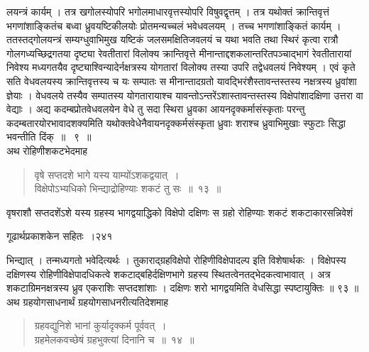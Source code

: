 \documentclass[11pt, openany]{book}
\begin{document}
\noindent लयन्त्रं कार्यम् । तत्र खगोलस्योपरि भगोलमाधारवृत्तस्योपरि विषुवद्वृत्तम् । तत्र यथोक्तं क्रान्तिवृत्तं भगणांशाङ्कितंच बध्वा ध्रुवयष्टिकीलयोः प्रोतमन्यच्चलं भवेधवलयम् । तच्च भगणांशाङ्कितं कार्यम् । ततस्तद्गोलयन्त्रं सम्यग्धुवाभिमुख यष्टिकं जलसमक्षितिजवलयं च यथा भवति तथा स्थिरं कृत्वा रात्रौ गोलगध्यच्छिद्रगतया दृष्ट्या रेवतीतारां विलोक्य क्रान्तिवृत्ते मीनान्ताद्दशकलान्तरितपञ्चाद्भागं रेवतीतारायां निवेश्य मध्यगतयैव दृष्ट्याश्विन्यादेर्नक्षत्रस्य योगतारां विलोक्य तस्या उपरि तद्वेधवलयं निवेश्यम् । एवं कृते सति वेधवलयस्य क्रान्तिवृत्तस्य च यः सम्पातः स मीनान्तादग्रतो यावद्भिरंशैस्तावन्तस्तस्य नक्षत्रस्य ध्रुवांशा ज्ञेयाः । वेधवलये तस्यैव सम्पातस्य योगतारायाश्च यावन्तोऽन्तरेंऽशास्तावन्तस्तस्य विक्षेपांशादक्षिणा उत्तरा वा वेद्याः । अद्य कदम्बप्रोतवेधवलयेन वेधे तु सदा स्थिरा ध्रुवका आयनदृक्कर्मासंस्कृताः परन्तु कदम्बतारयोरभावादशक्यमिति यथोक्तवेधेनैवायनदृक्कर्मसंस्कृता ध्रुवाः शराश्च ध्रुवाभिमुखाः स्फुटाः सिद्धा भवन्तीति दिंक्~॥ ~९~॥ \\
\noindent अथ रोहिणीशकटभेदमाह \textendash


\begin{quote}
{\ssi  वृषे सप्तदशे भागे यस्य याम्योंऽशकद्वयात्~।\\
 विक्षेपोऽभ्यधिको भिन्द्याद्रोहिण्याः शकटं तु सः~॥~१३~॥ }
 \end{quote}

 वृषराशौ सप्तदशेंऽशे यस्य ग्रहस्य भागद्वयाद्धिको विक्षेपो दक्षिणः स ग्रहो रोहिण्याः शकटं शकटाकारसन्निवेशं


\newpage


\hspace{3cm} गूढार्थप्रकाशकेन सहितः~।\hfill २४१
\vspace{1cm}


\noindent भिन्द्यात् । तन्मध्यगतो भवेदित्यर्थः । तुकाराद्ग्रहविक्षेपो रोहिणीविक्षेपादल्प इति विशेषार्थकः । विक्षेपस्य दक्षिणस्य रोहिणीविक्षेपादधिकत्वे शकटाद्बहिर्दक्षिणभागे ग्रहस्य स्थितत्वेनतद्भेदकत्वाभावात् । अत्र शकटाग्रिमनक्षत्रस्य ध्रुव एकराशिः सप्तदशांशाः । दक्षिणः शरो भागद्वयमिति वेधसिद्धा स्पष्टायुक्तिः ॥ ९३ ॥\\
\noindent अथ ग्रहयोगसाधनार्थं ग्रहयोगसाधनरीत्यतिदेशमाह \textendash


\begin{quote}
{\ssi ग्रहवद्युनिशे भानां कुर्यादृक्कर्म पूर्ववत्~।\\
ग्रहमेलकवच्छेषं ग्रहभुक्त्यां दिनानि च~॥~१४~॥ }
\end{quote}
\end{document}
